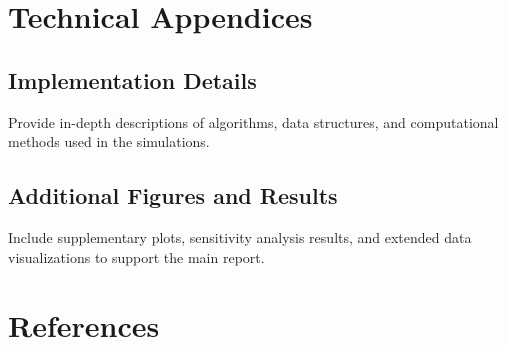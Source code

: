 \documentclass[12pt]{article}
\begin{document}
\appendix
\section{Technical Appendices}
\subsection{Implementation Details}
Provide in-depth descriptions of algorithms, data structures, and computational methods used in the simulations.

\subsection{Additional Figures and Results}
Include supplementary plots, sensitivity analysis results, and extended data visualizations to support the main report.

\vspace{1em}

\section{References}
\end{document}
